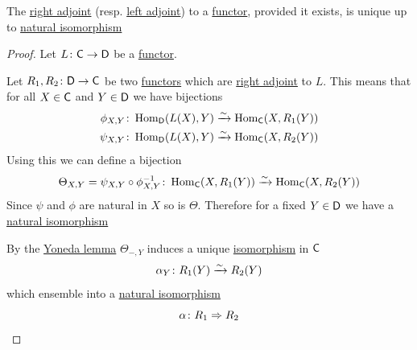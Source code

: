 \documentclass[../../main]{subfiles}
\begin{document}
\begin{proposition}\label{prop:uniqueness-adjoints}
  The \hyperref[def:adjoint-functors]{right adjoint} (resp. \hyperref[def:adjoint-functors]{left adjoint}) to a \hyperref[def:functor]{functor}, provided it exists, is unique up to \hyperref[def:natural-transformation]{natural isomorphism}
\end{proposition}
\begin{proof}
  Let \(L\colon \mathsf{C} \to \mathsf{D}\) be a \hyperref[def:functor]{functor}.
  
  Let \(R_{1}, R_{2}\colon \mathsf{D} \to \mathsf{C}\) be two \hyperref[def:functor]{functors} which are \hyperref[def:adjoint-functors]{right adjoint} to \(L\).
  This means that for all \(X \in \mathsf{C}\) and \(Y \in \mathsf{D}\) we have bijections
  \begin{align*}
    \phi_{X, Y}\colon& \operatorname{Hom}_{\mathsf{D}}(L(X), Y) \xrightarrow{\sim} \operatorname{Hom}_{\mathsf{C}}(X, R_{1}(Y)) \\
    \psi_{X, Y}\colon& \operatorname{Hom}_{\mathsf{D}}(L(X), Y) \xrightarrow{\sim} \operatorname{Hom}_{\mathsf{C}}(X, R_{2}(Y))
  \end{align*}
  Using this we can define a bijection
  \begin{equation*}
    \Theta_{X, Y} = \psi_{X, Y} \circ \phi_{X, Y}^{-1}\colon \operatorname{Hom}_{\mathsf{C}}(X, R_{1}(Y)) \xrightarrow{\sim} \operatorname{Hom}_{\mathsf{C}}(X, R_{2}(Y))
  \end{equation*}
  Since \(\psi\) and \(\phi\) are natural in \(X\) so is \(\Theta\).
  Therefore for a fixed \(Y \in \mathsf{D}\) we have a \hyperref[def:natural-transformation]{natural isomorphism}
  \begin{center}
  \end{center}

  By the \hyperref[thm:yoneda-lemma]{Yoneda lemma} \(\Theta_{-, Y}\) induces a unique \hyperref[def:categorical-isomorphism]{isomorphism} in \(\mathsf{C}\)
  \begin{equation*}
    \alpha_{Y}\colon R_{1}(Y) \xrightarrow{\sim} R_{2}(Y)
  \end{equation*}
  which ensemble into a \hyperref[def:natural-transformation]{natural isomorphism}
  \begin{equation*}
    \alpha\colon R_{1} \Rightarrow R_{2} \qedhere
  \end{equation*}
\end{proof}
\end{document}
